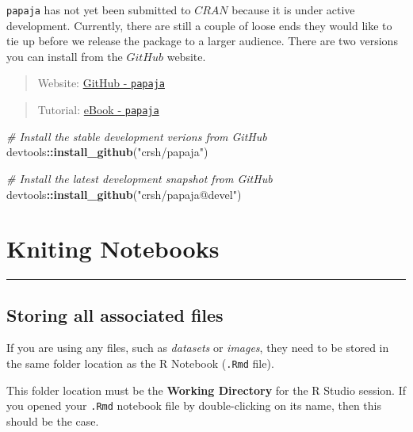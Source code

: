 \documentclass[]{book}
\newenvironment{Shaded}{\begin{snugshade}}{\end{snugshade}}
\newcommand{\KeywordTok}[1]{\textcolor[rgb]{0.13,0.29,0.53}{\textbf{#1}}}
\newcommand{\StringTok}[1]{\textcolor[rgb]{0.31,0.60,0.02}{#1}}
\newcommand{\CommentTok}[1]{\textcolor[rgb]{0.56,0.35,0.01}{\textit{#1}}}
\newcommand{\OperatorTok}[1]{\textcolor[rgb]{0.81,0.36,0.00}{\textbf{#1}}}
\newcommand{\NormalTok}[1]{#1}
\theoremstyle{definition}
\theoremstyle{definition}
\theoremstyle{definition}
\theoremstyle{remark}
\begin{document}
\texttt{papaja} has not yet been submitted to \(CRAN\) because it is
under active development. Currently, there are still a couple of loose
ends they would like to tie up before we release the package to a larger
audience. There are two versions you can install from the \(GitHub\)
website.

\begin{quote}
Website: \href{https://github.com/crsh/papaja}{GitHub - \texttt{papaja}}
\end{quote}

\begin{quote}
Tutorial: \href{https://crsh.github.io/papaja_man/}{eBook -
\texttt{papaja}}
\end{quote}

\begin{Shaded}
\begin{Highlighting}[]
\CommentTok{# Install the stable development verions from GitHub}
\NormalTok{devtools}\OperatorTok{::}\KeywordTok{install_github}\NormalTok{(}\StringTok{"crsh/papaja"}\NormalTok{)}

\CommentTok{# Install the latest development snapshot from GitHub}
\NormalTok{devtools}\OperatorTok{::}\KeywordTok{install_github}\NormalTok{(}\StringTok{"crsh/papaja@devel"}\NormalTok{)}
\end{Highlighting}
\end{Shaded}

\chapter{Kniting Notebooks}\label{kniting-notebooks}

\begin{center}\rule{0.5\linewidth}{\linethickness}\end{center}

\section{Storing all associated
files}\label{storing-all-associated-files}

If you are using any files, such as \emph{datasets} or \emph{images},
they need to be stored in the same folder location as the R Notebook
(\texttt{.Rmd} file).

This folder location must be the \textbf{Working Directory} for the R
Studio session. If you opened your \texttt{.Rmd} notebook file by
double-clicking on its name, then this should be the case.
\end{document}
